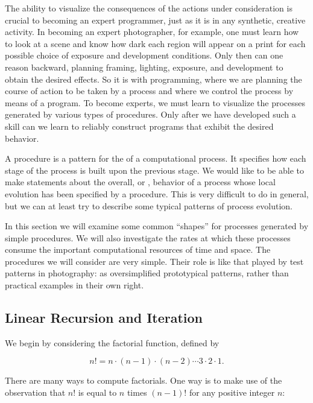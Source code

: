 The ability to visualize the consequences of the actions under consideration is
crucial to becoming an expert programmer, just as it is in any synthetic,
creative activity.  In becoming an expert photographer, for example, one must
learn how to look at a scene and know how dark each region will appear on a
print for each possible choice of exposure and development conditions.  Only
then can one reason backward, planning framing, lighting, exposure, and
development to obtain the desired effects.  So it is with programming, where we
are planning the course of action to be taken by a process and where we control
the process by means of a program.  To become experts, we must learn to
visualize the processes generated by various types of procedures.  Only after
we have developed such a skill can we learn to reliably construct programs that
exhibit the desired behavior.

A procedure is a pattern for the  of a computational
process.  It specifies how each stage of the process is built upon the previous
stage.  We would like to be able to make statements about the overall, or
, behavior of a process whose local evolution has been
specified by a procedure.  This is very difficult to do in general, but we can
at least try to describe some typical patterns of process evolution.

In this section we will examine some common ``shapes'' for processes generated
by simple procedures.  We will also investigate the rates at which these
processes consume the important computational resources of time and space.  The
procedures we will consider are very simple.  Their role is like that played by
test patterns in photography: as oversimplified prototypical patterns, rather
than practical examples in their own right.



\subsection{Linear Recursion and Iteration}
\label{Section 1.2.1}

We begin by considering the factorial function, defined by

$$n! = n \cdot (n - 1) \cdot (n - 2) \cdots 3 \cdot 2 \cdot 1.$$

There are many ways to compute factorials.  One way is to make use of the
observation that \( n! \) is equal to \( n \) times \( (n - 1)! \) for any positive
integer \( n \):

